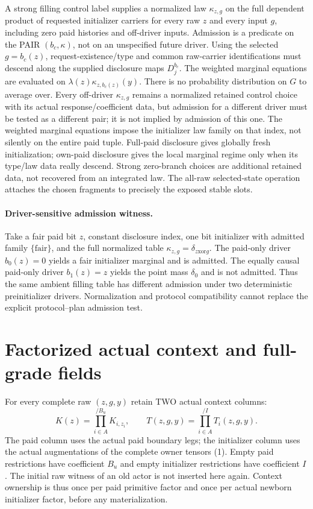 \documentclass[11pt]{article}
\begin{document}
A strong filling control label supplies a normalized law $\kappa_{z,g}$ on the full dependent product of requested initializer carriers for every raw $z$ and every input $g$, including zero paid histories and off-driver inputs. Admission is a predicate on the PAIR $(b_c,\kappa)$, not on an unspecified future driver. Using the selected $g=b_c(z)$, request-existence/type and common raw-carrier identifications must descend along the supplied disclosure maps $D_j^{b_c}$. The weighted marginal equations are evaluated on $\lambda(z)\kappa_{z,b_c(z)}(y)$. There is no probability distribution on $G$ to average over. Every off-driver $\kappa_{z,g}$ remains a normalized retained control choice with its actual response/coefficient data, but admission for a different driver must be tested as a different pair; it is not implied by admission of this one. The weighted marginal equations impose the initializer law family on that index, not silently on the entire paid tuple. Full-paid disclosure gives globally fresh initialization; own-paid disclosure gives the local marginal regime only when its type/law data really descend. Strong zero-branch choices are additional retained data, not recovered from an integrated law. The all-raw selected-state operation attaches the chosen fragments to precisely the exposed stable slots.

\paragraph{Driver-sensitive admission witness.}
Take a fair paid bit $z$, constant disclosure index, one bit initializer with admitted family $\{\mathrm{fair}\}$, and the full normalized table $\kappa_{z,g}=\delta_{z\mathbin{\mathrm{xor}}g}$. The paid-only driver $b_0(z)=0$ yields a fair initializer marginal and is admitted. The equally causal paid-only driver $b_1(z)=z$ yields the point mass $\delta_0$ and is not admitted. Thus the same ambient filling table has different admission under two deterministic preinitializer drivers. Normalization and protocol compatibility cannot replace the explicit protocol--plan admission test.

\section{Factorized actual context and full-grade fields}
For every complete raw $(z,g,y)$ retain TWO actual context columns:
\[
 K(z)=\prod_{i\in A}^{/B_u}K_{i,z_i},\qquad
 T(z,g,y)=\prod_{i\in A}^{/I}T_i(z,g,y).               \tag{2}
\]
The paid column uses the actual paid boundary legs; the initializer column uses the actual augmentations of the complete owner tensors (1). Empty paid restrictions have coefficient $B_u$ and empty initializer restrictions have coefficient $I$. The initial raw witness of an old actor is not inserted here again. Context ownership is thus once per paid primitive factor and once per actual newborn initializer factor, before any materialization.
\end{document}
